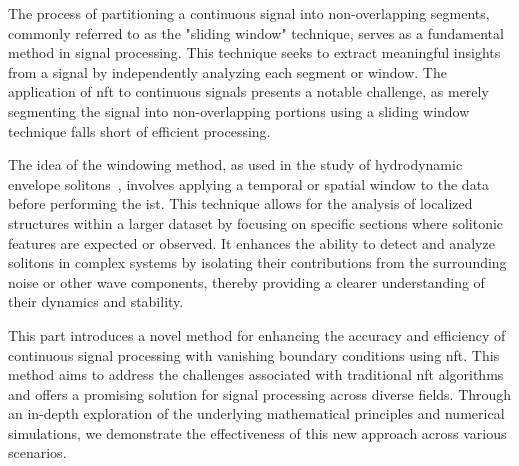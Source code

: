 The process of partitioning a continuous signal into non-overlapping segments, commonly referred to as the "sliding window" technique, serves as a fundamental method in signal processing. This technique seeks to extract meaningful insights from a signal by independently analyzing each segment or window.
The application of \acrshort{nft} to continuous signals presents a notable challenge, as merely segmenting the signal into non-overlapping portions using a sliding window technique falls short of efficient processing.

The idea of the windowing method, as used in the study of hydrodynamic envelope solitons~\cite{slunyaev2006nonlinear,slunyaev2018analysis,slunyaev2021persistence}, involves applying a temporal or spatial window to the data before performing the \acrlong{ist}. This technique allows for the analysis of localized structures within a larger dataset by focusing on specific sections where solitonic features are expected or observed. It enhances the ability to detect and analyze solitons in complex systems by isolating their contributions from the surrounding noise or other wave components, thereby providing a clearer understanding of their dynamics and stability.

This part introduces a novel method for enhancing the accuracy and efficiency of continuous signal processing with vanishing boundary conditions using \acrshort{nft}. This method aims to address the challenges associated with traditional \acrshort{nft} algorithms and offers a promising solution for signal processing across diverse fields. Through an in-depth exploration of the underlying mathematical principles and numerical simulations, we demonstrate the effectiveness of this new approach across various scenarios.





